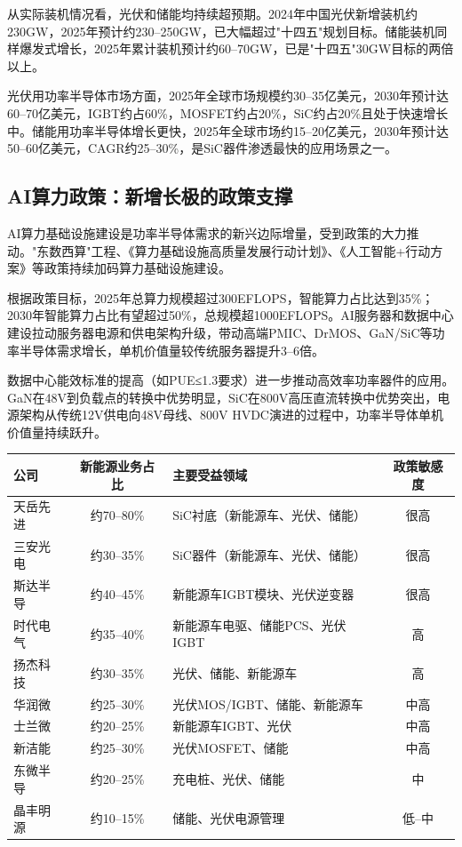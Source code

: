 从实际装机情况看，光伏和储能均持续超预期。2024年中国光伏新增装机约230GW，2025年预计约230--250GW，已大幅超过"十四五"规划目标。储能装机同样爆发式增长，2025年累计装机预计约60--70GW，已是"十四五"30GW目标的两倍以上。

光伏用功率半导体市场方面，2025年全球市场规模约30--35亿美元，2030年预计达60--70亿美元，IGBT约占60\%，MOSFET约占20\%，SiC约占20\%且处于快速增长中。储能用功率半导体增长更快，2025年全球市场约15--20亿美元，2030年预计达50--60亿美元，CAGR约25--30\%，是SiC器件渗透最快的应用场景之一。

\subsection{AI算力政策：新增长极的政策支撑}

AI算力基础设施建设是功率半导体需求的新兴边际增量，受到政策的大力推动。"东数西算"工程、《算力基础设施高质量发展行动计划》、《人工智能+行动方案》等政策持续加码算力基础设施建设。

根据政策目标，2025年总算力规模超过300EFLOPS，智能算力占比达到35\%；2030年智能算力占比有望超过50\%，总规模超1000EFLOPS。AI服务器和数据中心建设拉动服务器电源和供电架构升级，带动高端PMIC、DrMOS、GaN/SiC等功率半导体需求增长，单机价值量较传统服务器提升3--6倍。

数据中心能效标准的提高（如PUE≤1.3要求）进一步推动高效率功率器件的应用。GaN在48V到负载点的转换中优势明显，SiC在800V高压直流转换中优势突出，电源架构从传统12V供电向48V母线、800V HVDC演进的过程中，功率半导体单机价值量持续跃升。

\begin{exhibitbox}[表 8-10：A股功率半导体公司新能源政策敏感度排序]
\centering
\small
\begin{tabularx}{\textwidth}{l c X c}
\toprule
\textbf{公司} & \textbf{新能源业务占比} & \textbf{主要受益领域} & \textbf{政策敏感度} \\
\midrule
天岳先进 & 约70--80\% & SiC衬底（新能源车、光伏、储能） & \textcolor{riskred}{很高} \\
三安光电 & 约30--35\% & SiC器件（新能源车、光伏、储能） & \textcolor{riskred}{很高} \\
斯达半导 & 约40--45\% & 新能源车IGBT模块、光伏逆变器 & \textcolor{riskred}{很高} \\
时代电气 & 约35--40\% & 新能源车电驱、储能PCS、光伏IGBT & \textcolor{riskred}{高} \\
扬杰科技 & 约30--35\% & 光伏、储能、新能源车 & \textcolor{riskred}{高} \\
华润微 & 约25--30\% & 光伏MOS/IGBT、储能、新能源车 & \textcolor{riskamber}{中高} \\
士兰微 & 约20--25\% & 新能源车IGBT、光伏 & \textcolor{riskamber}{中高} \\
新洁能 & 约25--30\% & 光伏MOSFET、储能 & \textcolor{riskamber}{中高} \\
东微半导 & 约20--25\% & 充电桩、光伏、储能 & \textcolor{riskamber}{中} \\
晶丰明源 & 约10--15\% & 储能、光伏电源管理 & \textcolor{riskamber}{低--中} \\
\bottomrule
\end{tabularx}
\end{exhibitbox}

